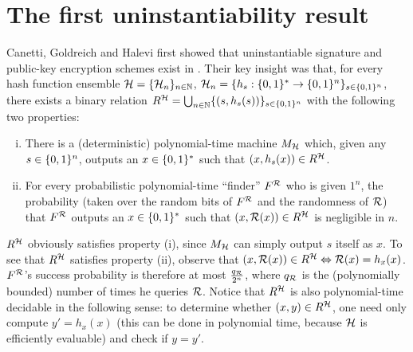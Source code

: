 \section{The first uninstantiability result}
\label{SEC:Original}
Canetti, Goldreich and Halevi first showed that uninstantiable signature and
public-key encryption schemes exist in \cite{canetti:romfails}. 
Their key insight was that, for every hash function ensemble $\mathcal{H} =
\{\mathcal{H}_n\}_{n \in \mathbb{N}}$, $\mathcal{H}_n = \{h_s : \{0,1\}^{*} \to \{0,1\}^{n}\}_{s \in \{0,1\}^{n}}$,
there exists a binary relation $R^{\mathcal{H}} = \bigcup_{n \in
\mathbb{N}}\{(s,h_s(s))\}_{s \in \{0,1\}^{n}}$ with the following two properties:
\begin{enumerate}[(i)]

\item There is a (deterministic) polynomial-time machine $M_{\mathcal{H}}$ which,
given any $s \in \{0,1\}^{n}$, outputs an $x \in \{0,1\}^{*}$ such that
$(x,h_s(x)) \in R^{\mathcal{H}}$.

\item For every probabilistic polynomial-time ``finder'' $F^{\mathcal{R}}$ who is
given $1^n$, the probability (taken over the random bits of $F^{\mathcal{R}}$ and the
randomness of $\mathcal{R}$) that $F^{\mathcal{R}}$ outputs an $x \in \{0,1\}^{*}$ such that
$(x,\mathcal{R}(x)) \in R^{\mathcal{H}}$ is negligible in $n$.

\end{enumerate}
$R^{\mathcal{H}}$ obviously satisfies property (i), since $M_{\mathcal{H}}$ can simply output
$s$ itself as $x$. To see that $R^{\mathcal{H}}$ satisfies property (ii), observe that
$(x,\mathcal{R}(x)) \in R^{\mathcal{H}} \Leftrightarrow \mathcal{R}(x) = h_x(x)$.  $F^{\mathcal{R}}$'s
success probability is therefore at most $\frac{q_{\mathcal{R}}}{2^n}$, where
$q_{\mathcal{R}}$ is the (polynomially bounded) number of times he queries $\mathcal{R}$.
Notice that $R^{\mathcal{H}}$ is also polynomial-time decidable in the following
sense: to determine whether $(x,y) \in R^{\mathcal{H}}$, one need only compute $y' =
h_x(x)$ (this can be done in polynomial time, because $\mathcal{H}$ is
efficiently evaluable) and check if $y = y'$.

